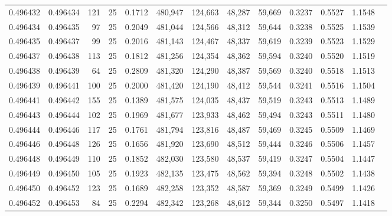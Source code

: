 \begin{tabular}{rrrrrrrrrrrrr}
0.496432 & 0.496434 &   121 &  25 &                                     0.1712 & 480,947 & 124,663 &  48,287 &  59,669 & 0.3237 & 0.5527 & 1.1548 \\
0.496434 & 0.496435 &    97 &  25 &                                     0.2049 & 481,044 & 124,566 &  48,312 &  59,644 & 0.3238 & 0.5525 & 1.1539 \\
0.496435 & 0.496437 &    99 &  25 &                                     0.2016 & 481,143 & 124,467 &  48,337 &  59,619 & 0.3239 & 0.5523 & 1.1529 \\
0.496437 & 0.496438 &   113 &  25 &                                     0.1812 & 481,256 & 124,354 &  48,362 &  59,594 & 0.3240 & 0.5520 & 1.1519 \\
0.496438 & 0.496439 &    64 &  25 &                                     0.2809 & 481,320 & 124,290 &  48,387 &  59,569 & 0.3240 & 0.5518 & 1.1513 \\
0.496439 & 0.496441 &   100 &  25 &                                     0.2000 & 481,420 & 124,190 &  48,412 &  59,544 & 0.3241 & 0.5516 & 1.1504 \\
0.496441 & 0.496442 &   155 &  25 &                                     0.1389 & 481,575 & 124,035 &  48,437 &  59,519 & 0.3243 & 0.5513 & 1.1489 \\
0.496443 & 0.496444 &   102 &  25 &                                     0.1969 & 481,677 & 123,933 &  48,462 &  59,494 & 0.3243 & 0.5511 & 1.1480 \\
0.496444 & 0.496446 &   117 &  25 &                                     0.1761 & 481,794 & 123,816 &  48,487 &  59,469 & 0.3245 & 0.5509 & 1.1469 \\
0.496446 & 0.496448 &   126 &  25 &                                     0.1656 & 481,920 & 123,690 &  48,512 &  59,444 & 0.3246 & 0.5506 & 1.1457 \\
0.496448 & 0.496449 &   110 &  25 &                                     0.1852 & 482,030 & 123,580 &  48,537 &  59,419 & 0.3247 & 0.5504 & 1.1447 \\
0.496449 & 0.496450 &   105 &  25 &                                     0.1923 & 482,135 & 123,475 &  48,562 &  59,394 & 0.3248 & 0.5502 & 1.1438 \\
0.496450 & 0.496452 &   123 &  25 &                                     0.1689 & 482,258 & 123,352 &  48,587 &  59,369 & 0.3249 & 0.5499 & 1.1426 \\
0.496452 & 0.496453 &    84 &  25 &                                     0.2294 & 482,342 & 123,268 &  48,612 &  59,344 & 0.3250 & 0.5497 & 1.1418 \\

\end{tabular}
